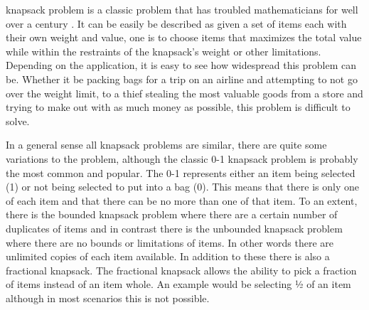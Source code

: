 \documentclass[10pt,journal,compsoc]{IEEEtran}
\begin{document}
% 
% 
% 
% 
 knapsack problem is a classic problem that has troubled
mathematicians for well over a century \cite{mathews_partition_1896}. It can be
easily be described as given a set of items each with their own weight and
value, one is to choose items that maximizes the total value while within the
restraints of the knapsack's weight or other limitations. Depending on the
application, it is easy to see how widespread this problem can be. Whether it be
packing bags for a trip on an airline and attempting to not go over the weight
limit, to a thief stealing the most valuable goods from a store and trying to
make out with as much money as possible, this problem is difficult to solve.

In a general sense all knapsack problems are similar, there are quite some
variations to the problem, although the classic 0-1 knapsack problem is probably
the most common and popular. The 0-1 represents either an item being selected
(1) or not being selected to put into a bag (0). This means that there is only
one of each item and that there can be no more than one of that item. To an
extent, there is the bounded knapsack problem where there are a certain number
of duplicates of items and in contrast there is the unbounded knapsack problem
where there are no bounds or limitations of items. In other words there are
unlimited copies of each item available. In addition to these there is also a
fractional knapsack. The fractional knapsack allows the ability to pick a
fraction of items instead of an item whole. An example would be selecting ½ of
an item although in most scenarios this is not possible.
\end{document}
